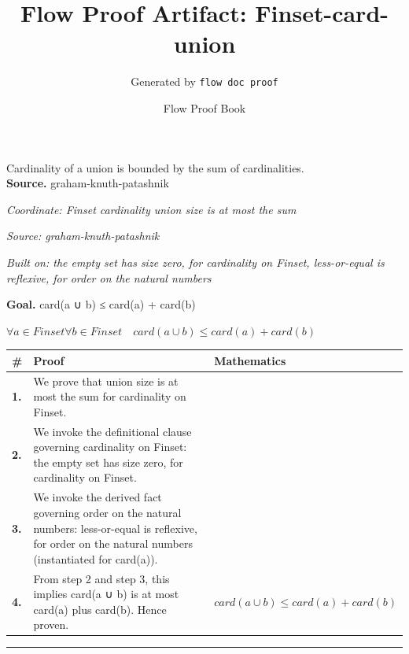 \documentclass[11pt]{article}
\title{Flow Proof Artifact: Finset-card-union}
\author{Generated by \texttt{flow doc proof}}
\date{Flow Proof Book}
\theoremstyle{definition}
\begin{document}
\maketitle
Cardinality of a union is bounded by the sum of cardinalities.\\[0.5em]
\textbf{Source.} graham-knuth-patashnik\\[0.5em]
\bigskip
{}\par
\smallskip\noindent\textit{Coordinate: Finset \cdot cardinality \cdot union size is at most the sum}\par
\smallskip\noindent\textit{Source: graham-knuth-patashnik}\par
\smallskip\noindent\textit{Built on: the empty set has size zero, for cardinality on Finset, less-or-equal is reflexive, for order on the natural numbers}\par
\medskip
\noindent\textbf{Goal.} card(a ∪ b) ≤ card(a) + card(b)\par
\noindent$\displaystyle \forall a \in Finset \forall b \in Finset\quad card(a ∪ b) \le card(a) + card(b)$\par
\medskip
\noindent
\begin{tabular}{@{} >{\raggedright\arraybackslash}p{} >{\raggedright\arraybackslash}p{} >{\raggedleft\arraybackslash}p{} @{}}
\textbf{\#} & \textbf{Proof} & \textbf{Mathematics} \\
\midrule
\textbf{1.} & We prove that union size is at most the sum for cardinality on Finset. & \\[0.45em]
\textbf{2.} & We invoke the definitional clause governing cardinality on Finset: the empty set has size zero, for cardinality on Finset. & \\[0.45em]
\textbf{3.} & We invoke the derived fact governing order on the natural numbers: less-or-equal is reflexive, for order on the natural numbers (instantiated for card(a)). & \\[0.45em]
\textbf{4.} & From step 2 and step 3, this implies card(a ∪ b) is at most card(a) plus card(b). Hence proven. & $\displaystyle card(a ∪ b) \le card(a) + card(b)$ \\[0.45em]
\bottomrule
\end{tabular}
\label{thm:Finset-cardinality-union_size_is_at_most_the_sum}
\par\medskip\hrule
\end{document}
